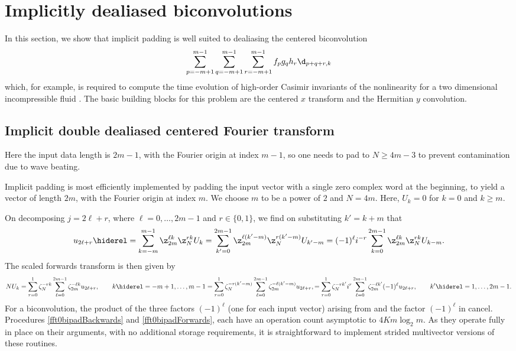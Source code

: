 \documentclass[final]{siamltex}
\def\bel{\begin{dmath}}
\def\eel{\end{dmath}}
\def\no{\hiderel}
\begin{document}
\section{Implicitly dealiased biconvolutions}\label{hyperconv}
In this section, we show that implicit padding is well suited to
dealiasing the centered biconvolution
$$
\sum_{p=-m+1}^{m-1}\sum_{q=-m+1}^{m-1}\sum_{r=-m+1}^{m-1} f_p g_q h_r\d_{p+q+r,k}
$$
which, for example, is required to compute the time evolution of high-order
Casimir invariants of the nonlinearity for a two dimensional incompressible
fluid \cite{Bowman10}. The basic building blocks for this problem are the
centered $x$ transform and the Hermitian $y$ convolution.
\subsection{Implicit double dealiased centered Fourier transform}
\label{fft0bi}
Here the input data length is $2m-1$, with the Fourier origin at index
$m-1$, so one needs to pad to $N\ge 4m-3$ to prevent contamination due to
wave beating.

Implicit padding is most efficiently implemented by padding the input
vector with a single zero complex word at the beginning, to yield a vector
of length $2m$, with the Fourier origin at index $m$. We choose $m$ to be
a power of $2$ and $N=4m$. Here, $U_k=0$ for $k=0$ and $k\ge m$. 

On decomposing $j=2\ell+r$, where $\ell=0,\ldots, 2m-1$ and $r\in\{0,1\}$,
we find on substituting $k'=k+m$ that
\bel
u_{2\ell +r}\no=\sum_{k=-m}^{m-1}\z_{2m}^{\ell k} \z_N^{rk} U_k
=\sum_{k'=0}^{2m-1}\z_{2m}^{\ell (k'-m)} \z_N^{r(k'-m)} U_{k'-m}
=(-1)^\ell i^{-r}\sum_{k=0}^{2m-1}\z_{2m}^{\ell k} \z_N^{rk} U_{k-m}.
\label{fft0bibackwards}
\eel
The scaled forwards transform is then given by
\bel
NU_k=\sum_{r=0}^{1}\zeta_N^{-rk}\sum_{\ell=0}^{2m-1}\zeta_{2m}^{-\ell k} u_{2\ell+r},
\qquad k\no =-m+1,\ldots,m-1
=\sum_{r=0}^{1}\zeta_N^{-r(k'-m)}\sum_{\ell=0}^{2m-1}\zeta_{2m}^{-\ell (k'-m)} u_{2\ell+r},
=\sum_{r=0}^{1}\zeta_N^{-rk'}i^r\sum_{\ell=0}^{2m-1}\zeta_{2m}^{-\ell k'}(-1)^\ell u_{2\ell+r},
\qquad k'\no =1,\ldots,2m-1.\label{fft0biforwards}
\eel
For a biconvolution, the product of the three factors $(-1)^\ell$
(one for each input vector) arising from 
and the factor $(-1)^\ell$ in  cancel.
Procedures \ref{fft0bipadBackwards} and \ref{fft0bipadForwards},
each have an operation count asymptotic to $4Km\log_2 m$. As they
operate fully in place on their arguments, with no additional storage
requirements, it is straightforward to implement strided multivector
versions of these routines.
\end{document}
